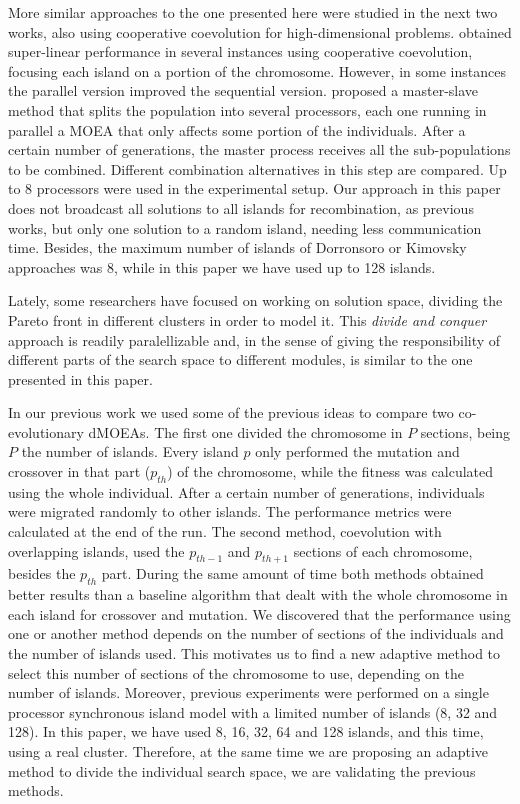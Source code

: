 \documentclass[Afour,sageh,times]{sagej}
\begin{document}
More similar approaches to the one presented here were studied in the
next two works, also using cooperative coevolution for high-dimensional problems. 
\cite{Dorronsoro13superlinear} obtained super-linear performance
in several instances using cooperative coevolution, focusing each island on a portion of the chromosome. However, in some instances the parallel version 
improved the sequential version.  \cite{Kimovski15Parallel} proposed a
master-slave method that splits the population into several processors,
each one running in parallel a MOEA that only affects some portion of
the individuals. After a certain number of generations, the master
process receives all the sub-populations to be combined. Different
combination alternatives in this step are compared. Up to 8 processors
were used in the experimental setup. Our approach in this paper does not
broadcast all solutions to all islands for recombination, as previous
works, but only one solution to a random island, needing less
communication time. Besides, the maximum number of islands of
Dorronsoro or Kimovsky approaches was 8, while in this paper we have
used up to 128 islands. 

Lately, some researchers \citep{cheng2015adaptive} have focused on
working on solution space, dividing the Pareto front in different
clusters in order to model it. This {\em divide and conquer} approach
is readily paralellizable and, in the sense of giving the
responsibility of different parts of the search space to different
modules, is similar to the one presented in this paper.

In our previous work \citep{Garcia16hpmoon} we used some of the previous ideas to compare two co-evolutionary dMOEAs. The first one divided the chromosome in $P$ sections, being $P$ the number of islands. Every island $p$ only performed the mutation and crossover in that part ($p_{th}$) of the chromosome, while the fitness was calculated using the whole individual. After a certain number of generations, individuals were migrated randomly to other islands. The performance metrics were calculated at the end of the run. The second method, coevolution with overlapping islands, used the $p_{th-1}$ and $p_{th+1}$ sections of each chromosome, besides the $p_{th}$ part. During the same amount of time both methods obtained better results than a baseline algorithm that dealt with the whole chromosome in each island for crossover and mutation. We discovered that the performance using one or another method depends on the number of sections of the individuals and the number of islands used. This motivates us to find a new adaptive method to select this number of sections of the chromosome to use, depending on the number of islands. Moreover, previous experiments were performed on a single processor synchronous island model with a limited number of islands (8, 32 and 128). In this paper, we have used 8, 16, 32, 64 and 128 islands, and this time, using a real cluster. Therefore, at the same time we are proposing an adaptive method to divide the individual search space, we are validating the previous methods.
\end{document}
